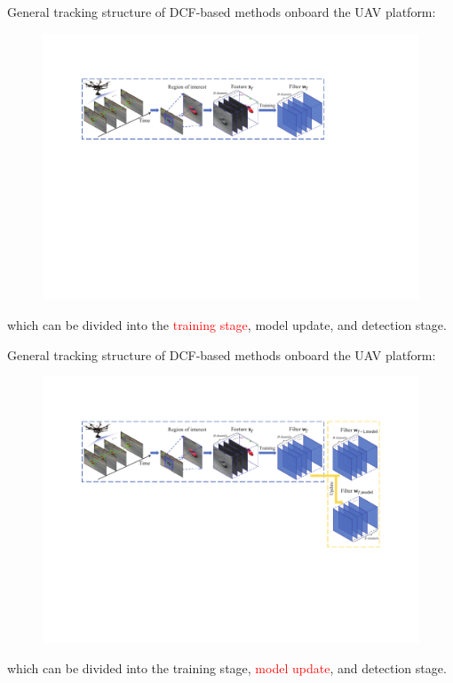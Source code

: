 \documentclass{beamer}
\begin{document}
\begin{frame}

    General tracking structure of DCF-based methods onboard the UAV platform:

    \begin{figure}[htpb]
        \begin{center}
            \includegraphics[width=0.7\linewidth, trim={100pt 100 100 90}]{fig/tracking_1.pdf}
        \end{center}
    \end{figure}

    which can be divided into the \textcolor{red}{training stage}, model update, and detection stage.

\end{frame}

\begin{frame}

    \addtocounter{footnote}{-1}
    \addtocounter{framenumber}{-1}
    General tracking structure of DCF-based methods onboard the UAV platform:

    \begin{figure}[htpb]
        \begin{center}
            \includegraphics[width=0.7\linewidth, trim={100pt 100 100 90}]{fig/tracking_2.pdf}
        \end{center}
    \end{figure}

    which can be divided into the training stage, \textcolor{red}{model update}, and detection stage.

\end{frame}
\end{document}
